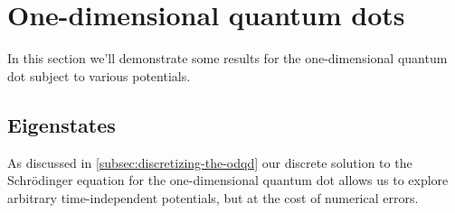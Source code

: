 \section{One-dimensional quantum dots}
    In this section we'll demonstrate some results for the one-dimensional
    quantum dot subject to various potentials.

    \subsection{Eigenstates}
        As discussed in \autoref{subsec:discretizing-the-odqd} our discrete
        solution to the Schrödinger equation for the one-dimensional quantum dot
        allows us to explore arbitrary time-independent potentials, but at the
        cost of numerical errors.
